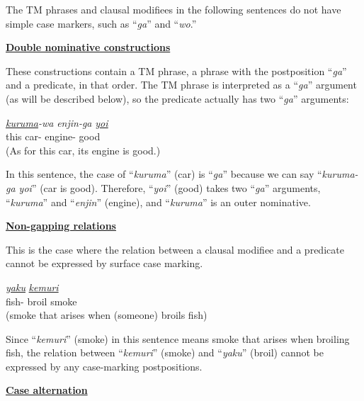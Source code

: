 \documentclass[english]{jnlp_1.4_rep}
\newcommand{\nom}{}
\newcommand{\acc}{}
\newcommand{\TOP}{}
\begin{document}
The TM phrases and clausal modifiees in the following
sentences do not have simple case markers, such as ``\textit{ga}'' and
``\textit{wo}.''


\noindent
\underline{\textbf{Double nominative constructions}}

\noindent
These constructions contain a TM phrase, a phrase with
the postposition ``\textit{ga}'' and a predicate, in that order. The
TM phrase is interpreted as a ``\textit{ga}'' argument (as will be
described below), so the predicate actually has two ``\textit{ga}'' arguments:

\begin{exe}
\ex \label{Example::DoubleNominative}
  {\textit{\underline{kuruma}-wa}} {\textit{enjin-ga}} {\textit{\underline{\underline{yoi}}}} \\
      {this} {car-\TOP} {engine-\nom} {good} \\
 \trans (As for this car, its engine is good.)
\end{exe}

\vspace{-3pt}
In this sentence, the case of ``\textit{kuruma}'' (car) is
``\textit{ga}'' because we can say ``\textit{kuruma-ga yoi}'' (car is
good). Therefore, ``\textit{yoi}'' (good) takes two ``\textit{ga}''
arguments, ``\textit{kuruma}'' and ``\textit{enjin}'' (engine), and
``\textit{kuruma}'' is an outer nominative.


\noindent
\underline{\textbf{Non-gapping relations}}

\noindent
This is the case where the relation between a clausal modifiee and a
predicate cannot be expressed by surface case marking.

\vspace{-3pt}
\begin{exe}
\ex
  {\textit{\underline{\underline{yaku}}}} {\textit{\underline{kemuri\vphantom{y}}}} \\
      {fish-\acc} {broil} {smoke} \\
 \trans (smoke that arises when (someone) broils fish)
\end{exe}
\vspace{-3pt}

Since ``\textit{kemuri}'' (smoke) in this sentence means smoke that
arises when broiling fish, the relation between ``\textit{kemuri}''
(smoke) and ``\textit{yaku}'' (broil) cannot be expressed by any
case-marking postpositions.


\noindent
\underline{\textbf{Case alternation}}
\end{document}
